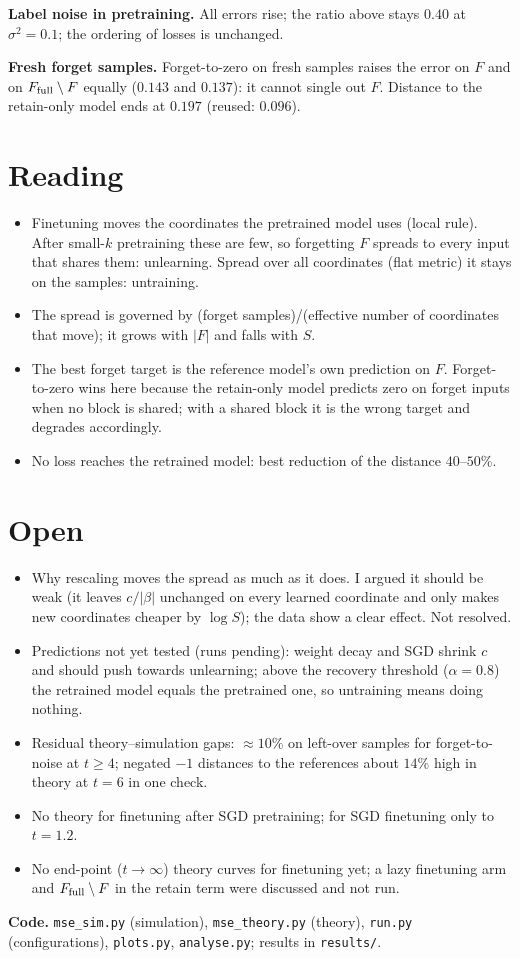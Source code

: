 \documentclass[10pt]{article}
\begin{document}
\textbf{Label noise in pretraining.} All errors rise; the ratio above stays $0.40$ at $\sigma^2=0.1$; the ordering of losses is unchanged.

\textbf{Fresh forget samples.} Forget-to-zero on fresh samples raises the error on $F$ and on $F_{\rm full}\setminus F$ equally ($0.143$ and $0.137$): it cannot single out $F$. Distance to the retain-only model ends at $0.197$ (reused: $0.096$).

\section{Reading}
\begin{itemize}[nosep,leftmargin=1.2em]
\item Finetuning moves the coordinates the pretrained model uses (local rule). After small-$k$ pretraining these are few, so forgetting $F$ spreads to every input that shares them: unlearning. Spread over all coordinates (flat metric) it stays on the samples: untraining.
\item The spread is governed by (forget samples)/(effective number of coordinates that move); it grows with $|F|$ and falls with $S$.
\item The best forget target is the reference model's own prediction on $F$. Forget-to-zero wins here because the retain-only model predicts zero on forget inputs when no block is shared; with a shared block it is the wrong target and degrades accordingly.
\item No loss reaches the retrained model: best reduction of the distance $40$--$50\%$.
\end{itemize}

\section{Open}
\begin{itemize}[nosep,leftmargin=1.2em]
\item Why rescaling moves the spread as much as it does. I argued it should be weak (it leaves $c/|\beta|$ unchanged on every learned coordinate and only makes new coordinates cheaper by $\log S$); the data show a clear effect. Not resolved.
\item Predictions not yet tested (runs pending): weight decay and SGD shrink $c$ and should push towards unlearning; above the recovery threshold ($\alpha=0.8$) the retrained model equals the pretrained one, so untraining means doing nothing.
\item Residual theory--simulation gaps: $\approx10\%$ on left-over samples for forget-to-noise at $t\ge4$; negated $-1$ distances to the references about $14\%$ high in theory at $t=6$ in one check.
\item No theory for finetuning after SGD pretraining; for SGD finetuning only to $t=1.2$.
\item No end-point ($t\to\infty$) theory curves for finetuning yet; a lazy finetuning arm and $F_{\rm full}\setminus F$ in the retain term were discussed and not run.
\end{itemize}

\small\textbf{Code.} \texttt{mse\_sim.py} (simulation), \texttt{mse\_theory.py} (theory), \texttt{run.py} (configurations), \texttt{plots.py}, \texttt{analyse.py}; results in \texttt{results/}.
\end{document}

